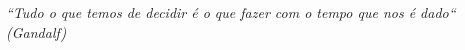 \begin{epigrafe}
    \vspace*{\fill}
	\begin{flushright}
		\textit{``Tudo o que temos de decidir é o que fazer com o tempo que nos é dado``\\
		(Gandalf)}
	\end{flushright}
\end{epigrafe}

